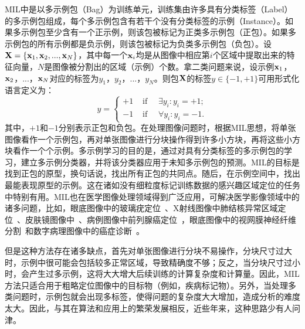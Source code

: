MIL中是以多示例包（Bag）为训练单元，训练集由许多具有分类标签（Label）的多示例包组成，每个多示例包含有若干个没有分类标签的示例（Instance）。如果多示例包至少含有一个正示例，则该包被标记为正类多示例包（正包）。如果多示例包的所有示例都是负示例，则该包被标记为负类多示例包（负包）。设$\mathbf{X}=\{\mathbf{x}_1,\mathbf{x}_2,...,\mathbf{x}_N\}$，其中每一个$\mathbf{x}_i$均是从图像中相应第$i$个区域中提取出来的特征向量，$N$是图像被分割出的区域（示例）个数。拿二类问题来说，设示例${\mathbf{x}_1}$，$\mathbf{x}_2$，...，$\mathbf{x}_N$对应的标签为${y_1}$，${y_2}$，...，${y_N}$。则包$\mathbf{X}$的标签$y\in \{-1,+1\}$可用形式化语言定义为：
\begin{equation}
y=\left\{\begin{array}{ll}
{+1} & {\text { if } \quad \exists {y}_{i}: {y}_{i}=+1;} \\
{-1} & {\text { if } \quad \forall {y}_{i}: {y}_{i}=-1.}
\end{array}\right.
\end{equation}
其中，$+1$和$-1$分别表示正包和负包。在处理图像问题时，根据MIL思想，将单张图像看作一个示例包，再对单张图像进行分块操作得到许多小方块，再将这些小方块看作一个个示例。多示例学习的目的是，通过对具有分类标签的多示例包的学习，建立多示例分类器，并将该分类器应用于未知多示例包的预测。MIL的目标是找到正包的原型，换句话说，找出所有正包的共同点。随后，在示例空间中，找出最能表现原型的示例。这在诸如没有细粒度标记训练数据的感兴趣区域定位的任务中特别有用。MIL也在医学图像处理领域得到广泛应用，可解决医学影像领域中的诸多问题，比如，眼底图像中的玻璃疣定位~\cite{lu2015effective}、X射线图像中肺结核异常区域定位~\cite{melendez2014novel}、皮肤镜图像中~\cite{madooei2018learning}、病例图像中前列腺癌定位~\cite{campanella2018terabyte}，眼底图像中的视网膜神经纤维分割~\cite{manivannan2017subcategory}和数字病理图像中的癌症诊断~\cite{kandemir2014empowering}。

但是这种方法存在诸多缺点，首先对单张图像进行分块不易操作，分块尺寸过大时，示例中很可能会包括较多正常区域，导致精确度不够；反之，当分块尺寸过小时，会产生过多示例，这将大大增大后续训练的计算复杂度和计算量。因此，MIL方法只适合用于粗略定位图像中的目标物（例如，疾病标记物）。另外，当处理多类问题时，示例包就会出现多标签，使得问题的复杂度大大增加，造成分析的难度太大。因此，与其在算法和应用上的繁荣发展相反，近些年来，这种思路少有人问津。

